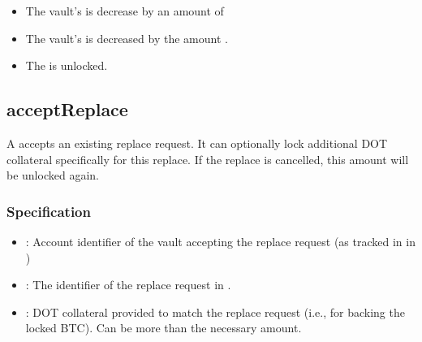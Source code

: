 \documentclass[a4paper,10pt,english]{sphinxmanual}
\begin{document}
\begin{itemize}
\item {} 
The vault’s  is decrease by an amount of 

\item {} 
The vault’s  is decreased by the amount .

\item {} 
The  is unlocked.

\end{itemize}


\subsection{acceptReplace}
\label{\detokenize{spec/replace:acceptreplace}}\label{\detokenize{spec/replace:id7}}
A  accepts an existing replace request. It can optionally lock additional DOT collateral specifically for this replace. If the replace is cancelled, this amount will be unlocked again.


\subsubsection{Specification}
\label{\detokenize{spec/replace:id8}}


\begin{itemize}
\item {} 
: Account identifier of the vault accepting the replace request (as tracked in  in {\hyperref[\detokenize{spec/vault-registry:vault-registry}]{}})

\item {} 
: The identifier of the replace request in .

\item {} 
: DOT collateral provided to match the replace request (i.e., for backing the locked BTC). Can be more than the necessary amount.

\end{itemize}
\end{document}
